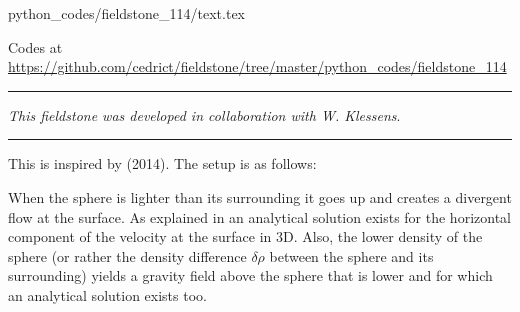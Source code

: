 \begin{flushright} {\tiny {\color{gray} python\_codes/fieldstone\_114/text.tex}} \end{flushright}

%

\begin{center}
Codes at \url{https://github.com/cedrict/fieldstone/tree/master/python_codes/fieldstone_114}
\end{center}

\par\noindent\rule{\textwidth}{0.4pt}

{\sl This fieldstone was developed in collaboration with W. Klessens}. 

\par\noindent\rule{\textwidth}{0.4pt}

This \stone is inspired by \textcite{bakp14} (2014).
The setup is as follows:

\begin{center}
\end{center}

When the sphere is lighter than its surrounding it goes up and creates a 
divergent flow at the surface. As explained in \textcite{bakp14} an analytical 
solution exists for the horizontal component of the velocity at the surface in 3D. 
Also, the lower density of the sphere (or rather the density difference $\delta\rho$
between the sphere and its surrounding) yields a gravity field 
above the sphere that is lower and for which an analytical solution exists too.

